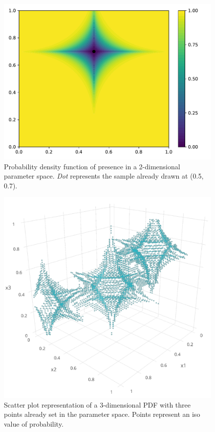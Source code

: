 \begin{figure}[!ht]               
\centering
\includegraphics[width=0.7\linewidth,height=\textheight,keepaspectratio]{fig/contributions/doe/inv_minkowsky.pdf}
\caption{Probability density function of presence in a 2-dimensional parameter space. \emph{Dot} represents the sample already drawn at (0.5, 0.7).}
 \label{fig:minkowsky}
\end{figure}

\begin{figure}[!ht]
\centering
\includegraphics[width=0.7\linewidth,keepaspectratio]{fig/contributions/doe/3d_star.png}
\caption{Scatter plot representation of a 3-dimensional PDF with three points already set in the parameter space. Points represent an iso value of probability.}
\label{fig:3d_kde}
\end{figure}


